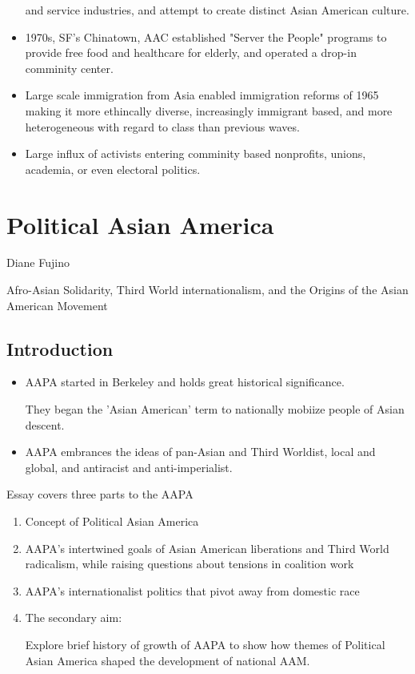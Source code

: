 \documentclass{article}
\begin{document}
\begin{itemize}
    and service industries, and attempt to create distinct Asian American culture.
  \item 1970s, SF's Chinatown, AAC established "Server the People" programs
    to provide free food and healthcare for elderly, and operated a drop-in
    comminity center.
  \item Large scale immigration from Asia enabled immigration reforms of 1965
    making it more ethincally diverse, increasingly immigrant based,
    and more heterogeneous with regard to class than previous waves.
  \item Large influx of activists entering 
    comminity based nonprofits, unions,
    academia, or even electoral politics.
\end{itemize}

\section{Political Asian America}
Diane Fujino

Afro-Asian Solidarity, Third World internationalism, and the 
Origins of the Asian American Movement

\subsection{Introduction}
\begin{itemize}
  \item AAPA started in Berkeley and holds great historical significance.

    They began the 'Asian American' term to nationally
    mobiize people of Asian descent.
  \item AAPA embrances the ideas of pan-Asian and Third Worldist, local and global,
    and antiracist and anti-imperialist.
\end{itemize}

Essay covers three parts to the AAPA
\begin{enumerate}
  \item Concept of Political Asian America
  \item AAPA's intertwined goals of Asian American liberations
    and Third World radicalism,
    while raising questions about tensions in coalition work
  \item AAPA's internationalist politics that pivot away from domestic race
  \item The secondary aim:

    Explore brief history of growth of AAPA to show how themes
    of Political Asian America shaped the development of national AAM.

\end{enumerate}
\end{document}
